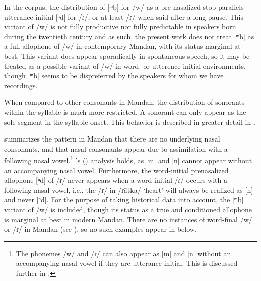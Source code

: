 In the corpus, the distribution of [ᵐb] for /w/ as a pre-nasalized stop parallels utterance-initial [ⁿd] for /ɾ/, or at least /ɾ/ when said after a long pause. This variant of /w/ is not fully productive nor fully predictable in speakers born during the twentieth century and as such, the present work does not treat [ᵐb] as a full allophone of /w/ in contemporary Mandan, with its status marginal at best. This variant does appear sporadically in spontaneous speech, so it may be treated as a possible variant of /w/ in word- or utterence-initial environments, though [ᵐb] seems to be dispreferred by the speakers for whom we have recordings.



When compared to other consonants in Mandan, the distribution of sonorants within the syllable is much more restricted. A sonorant can only appear as the sole segment in the syllable onset. This behavior is described in greater detail in .



   summarizes the pattern in Mandan that there are no underlying nasal consonants, and that nasal consonants appear due to assimilation with a following nasal vowel.\footnote{The phonemes /w/ and /ɾ/ can also appear as [m] and [n] without an accompanying nasal vowel if they are utterance-initial. This is discussed further in .} \citeauthor{hollow1970}'s (\citeyear[18]{hollow1970}) analysis holds, as [m] and [n] cannot appear without an accompanying nasal vowel. Furthermore, the word-initial prenasalized allophone [ⁿd] of /ɾ/ never appears when a word-initial /ɾ/ occurs with a following nasal vowel, i.e., the /ɾ/ in /ɾãtka/ `heart' will always be realized as [n] and never [ⁿd].  For the purpose of taking historical data into account, the [ᵐb] variant of /w/ is included, though its status as a true and conditioned allophone is marginal at best in modern Mandan. There are no instances of word-final /w/ or /ɾ/ in Mandan (see ), so no such examples appear in  below.

